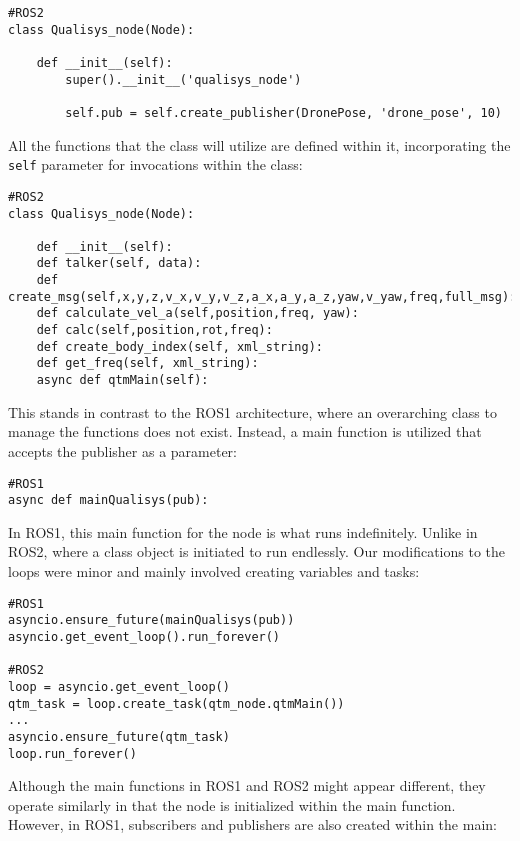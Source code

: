 \begin{lstlisting}[language=PythonPlus]
#ROS2
class Qualisys_node(Node):

    def __init__(self):
        super().__init__('qualisys_node')

        self.pub = self.create_publisher(DronePose, 'drone_pose', 10)

\end{lstlisting}

All the functions that the class will utilize are defined within it, incorporating the \verb|self| parameter for invocations within the class:

\begin{lstlisting}[language=PythonPlus]
#ROS2
class Qualisys_node(Node):

    def __init__(self):
    def talker(self, data):
    def create_msg(self,x,y,z,v_x,v_y,v_z,a_x,a_y,a_z,yaw,v_yaw,freq,full_msg):
    def calculate_vel_a(self,position,freq, yaw):
    def calc(self,position,rot,freq):
    def create_body_index(self, xml_string):
    def get_freq(self, xml_string):
    async def qtmMain(self):

\end{lstlisting}

This stands in contrast to the ROS1 architecture, where an overarching class to manage the functions does not exist. Instead, a main function is utilized that accepts the publisher as a parameter:

\begin{lstlisting}[language=PythonPlus]
#ROS1
async def mainQualisys(pub):

\end{lstlisting}

In ROS1, this main function for the node is what runs indefinitely. Unlike in ROS2, where a class object is initiated to run endlessly. Our modifications to the loops were minor and mainly involved creating variables and tasks:

\begin{lstlisting}[language=PythonPlus]
#ROS1
asyncio.ensure_future(mainQualisys(pub))
asyncio.get_event_loop().run_forever()

#ROS2
loop = asyncio.get_event_loop()
qtm_task = loop.create_task(qtm_node.qtmMain())
...
asyncio.ensure_future(qtm_task)
loop.run_forever()

\end{lstlisting}

Although the main functions in ROS1 and ROS2 might appear different, they operate similarly in that the node is initialized within the main function. However, in ROS1, subscribers and publishers are also created within the main:

